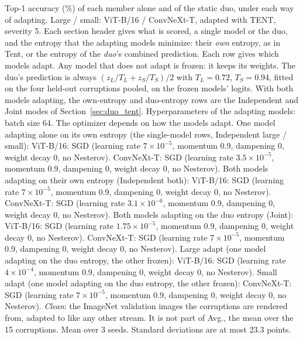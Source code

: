 \begin{table}[t]
    \centering
    \small
    \setlength{\tabcolsep}{3.5pt}
    \caption{Top-1 accuracy (\%) of each member alone and of the static duo, under each way of adapting. Large / small: ViT-B/16 / ConvNeXt-T, adapted with TENT, severity 5. Each section header gives what is scored, a single model or the duo, and the entropy that the adapting models minimize: their \emph{own} entropy, as in Tent, or the entropy of the \emph{duo}'s combined prediction. Each row gives which models adapt. Any model that does not adapt is frozen: it keeps its weights. The duo's prediction is always $(z_L / T_L + z_S / T_S) / 2$ with $T_L = 0.72$, $T_S = 0.94$, fitted on the four held-out corruptions pooled, on the frozen models' logits. With both models adapting, the own-entropy and duo-entropy rows are the Independent and Joint modes of Section~\ref{sec:duo_tent}. Hyperparameters of the adapting models: batch size 64. The optimizer depends on how the models adapt. One model adapting alone on its own entropy (the single-model rows, Independent large / small): ViT-B/16: SGD (learning rate $7 \times 10^{-5}$, momentum 0.9, dampening 0, weight decay 0, no Nesterov). ConvNeXt-T: SGD (learning rate $3.5 \times 10^{-5}$, momentum 0.9, dampening 0, weight decay 0, no Nesterov). Both models adapting on their own entropy (Independent both): ViT-B/16: SGD (learning rate $7 \times 10^{-5}$, momentum 0.9, dampening 0, weight decay 0, no Nesterov). ConvNeXt-T: SGD (learning rate $3.1 \times 10^{-6}$, momentum 0.9, dampening 0, weight decay 0, no Nesterov). Both models adapting on the duo entropy (Joint): ViT-B/16: SGD (learning rate $1.75 \times 10^{-5}$, momentum 0.9, dampening 0, weight decay 0, no Nesterov). ConvNeXt-T: SGD (learning rate $7 \times 10^{-5}$, momentum 0.9, dampening 0, weight decay 0, no Nesterov). Large adapt (one model adapting on the duo entropy, the other frozen): ViT-B/16: SGD (learning rate $4 \times 10^{-4}$, momentum 0.9, dampening 0, weight decay 0, no Nesterov). Small adapt (one model adapting on the duo entropy, the other frozen): ConvNeXt-T: SGD (learning rate $7 \times 10^{-5}$, momentum 0.9, dampening 0, weight decay 0, no Nesterov). \emph{Clean}: the ImageNet validation images the corruptions are rendered from, adapted to like any other stream. It is not part of Avg., the mean over the 15 corruptions. Mean over 3 seeds. Standard deviations are at most 23.3 points.}

\end{table}
